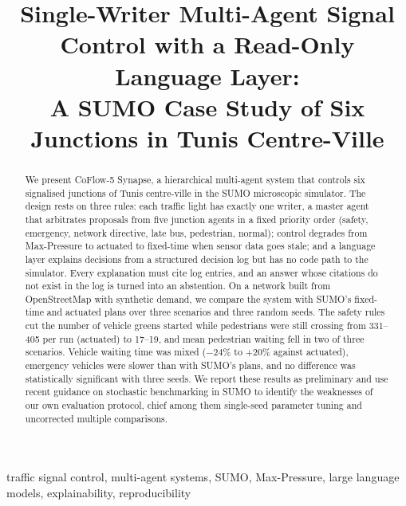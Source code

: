 \documentclass[conference]{IEEEtran}
\newcommand{\sys}{CoFlow-5 Synapse}
\begin{document}
\title{Single-Writer Multi-Agent Signal Control with a Read-Only Language Layer:\\
A SUMO Case Study of Six Junctions in Tunis Centre-Ville}

\author{
}

\maketitle

\begin{abstract}
We present \sys{}, a hierarchical multi-agent system that controls six signalised
junctions of Tunis centre-ville in the SUMO microscopic simulator. The design rests on
three rules: each traffic light has exactly one writer, a master agent that arbitrates
proposals from five junction agents in a fixed priority order (safety, emergency,
network directive, late bus, pedestrian, normal); control degrades from Max-Pressure to
actuated to fixed-time when sensor data goes stale; and a language layer explains decisions
from a structured decision log but has no code path to the simulator. Every explanation
must cite log entries, and an answer whose citations do not exist in the log is turned
into an abstention. On a network built from OpenStreetMap with synthetic demand, we compare
the system with SUMO's fixed-time and actuated plans over three scenarios and three random
seeds. The safety rules cut the number of vehicle greens started while pedestrians were
still crossing from 331--405 per run (actuated) to 17--19, and mean pedestrian waiting fell
in two of three scenarios. Vehicle waiting time was mixed ($-24\%$ to $+20\%$ against
actuated), emergency vehicles were slower than with SUMO's plans, and no difference was
statistically significant with three seeds. We report these results as preliminary and use
recent guidance on stochastic benchmarking in SUMO to identify the weaknesses of our own
evaluation protocol, chief among them single-seed parameter tuning and uncorrected multiple
comparisons.
\end{abstract}

\begin{IEEEkeywords}
traffic signal control, multi-agent systems, SUMO, Max-Pressure, large language models,
explainability, reproducibility
\end{IEEEkeywords}
\end{document}

